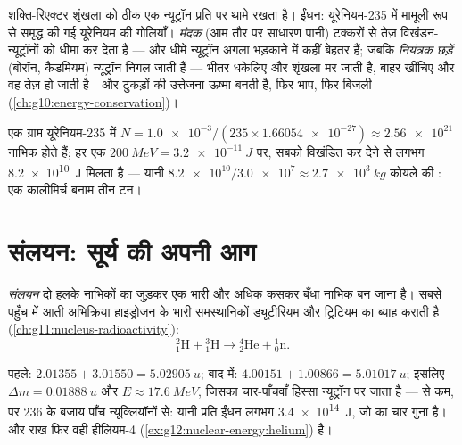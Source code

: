\begin{definition}[साधा हुआ रिएक्टर]\label{def:g12:nuclear-energy:reactor}
शक्ति-रिएक्टर शृंखला को ठीक एक न्यूट्रॉन प्रति  पर
थामे रखता है। ईंधन: यूरेनियम-235 में मामूली रूप से समृद्ध की गई यूरेनियम की
गोलियाँ। \emph{मंदक} (आम तौर पर साधारण पानी) टक्करों से तेज़
विखंडन-न्यूट्रॉनों को धीमा कर देता है --- और धीमे न्यूट्रॉन अगला
 भड़काने में कहीं बेहतर हैं; जबकि \emph{नियंत्रक छड़ें} (बोरॉन, कैडमियम) न्यूट्रॉन निगल जाती हैं --- भीतर धकेलिए और शृंखला मर जाती
है, बाहर खींचिए और वह तेज़ हो जाती है। और टुकड़ों की उत्तेजना ऊष्मा बनती है, फिर
भाप, फिर बिजली (\cref{ch:g10:energy-conservation})।
\end{definition}

\begin{example}[एक कालीमिर्च बनाम एक ट्रक]\label{ex:g12:nuclear-energy:gram}
एक ग्राम यूरेनियम-235 में
$N = \num{1.0e-3} / (235 \times \num{1.66054e-27}) \approx \num{2.56e21}$
नाभिक होते हैं; हर एक $\qty{200}{MeV} = \qty{3.2e-11}{J}$ पर, सबको विखंडित कर देने से लगभग \qty{8.2e10}{J} मिलता
है --- यानी $\num{8.2e10} /
\num{3.0e7} \approx \qty{2.7e3}{kg}$ कोयले की : एक कालीमिर्च बनाम तीन
टन।
\end{example}

\section{संलयन: सूर्य की अपनी आग}

\begin{definition}[संलयन]\label{def:g12:nuclear-energy:fusion}
\emph{संलयन} दो हलके नाभिकों का जुड़कर एक भारी और अधिक कसकर बँधा
नाभिक बन जाना है। सबसे पहुँच में आती अभिक्रिया हाइड्रोजन के भारी
समस्थानिकों ड्यूटीरियम और ट्रिटियम का ब्याह कराती है (\cref{ch:g11:nucleus-radioactivity}):
\[
{}^{2}_{1}\mathrm{H} + {}^{3}_{1}\mathrm{H} \longrightarrow
{}^{4}_{2}\mathrm{He} + {}^{1}_{0}\mathrm{n}.
\]
\end{definition}

\begin{example}[D--T, तौला हुआ]\label{ex:g12:nuclear-energy:dt}
पहले: $2.01355 + 3.01550 = \qty{5.02905}{u}$; बाद में: $4.00151 + 1.00866 = \qty{5.01017}{u}$; इसलिए $\Delta m = \qty{0.01888}{u}$ और $E \approx \qty{17.6}{MeV}$, जिसका चार-पाँचवाँ
हिस्सा न्यूट्रॉन पर जाता है ---  से कम, पर $236$ के बजाय
पाँच न्यूक्लियॉनों से: यानी प्रति  ईंधन लगभग
\qty{3.4e14}{J}, जो  का चार गुना है। और राख फिर वही हीलियम-4 (\cref{ex:g12:nuclear-energy:helium})
है।
\end{example}

